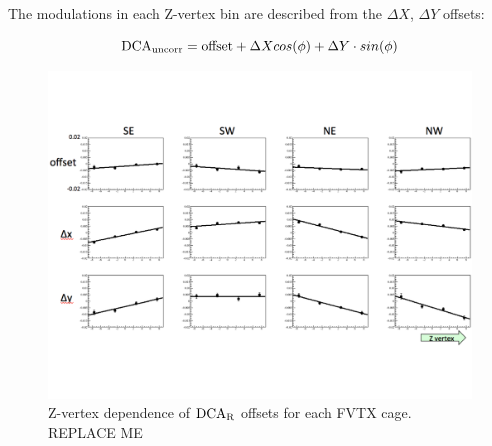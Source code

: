 \documentclass[12pt]{article}
\newcommand{\dcar}{$\rm{DCA}_{R}$ }
\begin{document}
The modulations in each Z-vertex bin are described from the $\Delta X$, $\Delta Y$ offsets:

\begin{equation}
\label{eq:dcar_offset}
{\rm DCA}_{\rm uncorr} = \textrm{offset} + \Delta X cos(\phi) + \Delta Y \cdot sin(\phi)
\end{equation}

\begin{figure}
	\includegraphics[width=1.0\textwidth]{Figures/alignment_pretiltcorr}
	\caption{\label{fig:fvtx_offsets} Z-vertex dependence of \dcar offsets for each FVTX cage.{\color{red} REPLACE ME}}
\end{figure}
\end{document}
